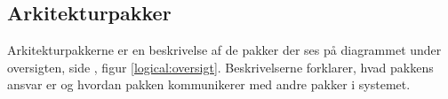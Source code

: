 \subsection{Arkitekturpakker}
Arkitekturpakkerne er en beskrivelse af de pakker der ses på diagrammet under oversigten, side \pageref{logical:oversigt}, figur \ref{logical:oversigt}. Beskrivelserne forklarer, hvad pakkens ansvar er og hvordan pakken kommunikerer med andre pakker i systemet.





